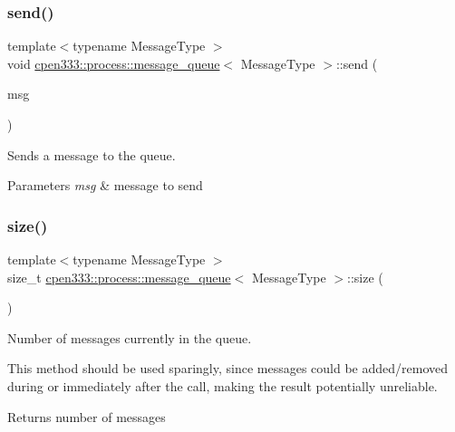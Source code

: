 \subsubsection{\texorpdfstring{send()}{send()}}
{\footnotesize\ttfamily template$<$typename Message\+Type $>$ \\
void \hyperlink{classcpen333_1_1process_1_1message__queue}{cpen333\+::process\+::message\+\_\+queue}$<$ Message\+Type $>$\+::send (\begin{DoxyParamCaption}\item[{const Message\+Type \&}]{msg }\end{DoxyParamCaption})\hspace{0.3cm}{\ttfamily [inline]}}



Sends a message to the queue. 


\begin{DoxyParams}{Parameters}
{\em msg} & message to send \\
\hline
\end{DoxyParams}
\mbox{\label{classcpen333_1_1process_1_1message__queue_aab604a8c153f7f918762abc7f2380396}} 
\subsubsection{\texorpdfstring{size()}{size()}}
{\footnotesize\ttfamily template$<$typename Message\+Type $>$ \\
size\+\_\+t \hyperlink{classcpen333_1_1process_1_1message__queue}{cpen333\+::process\+::message\+\_\+queue}$<$ Message\+Type $>$\+::size (\begin{DoxyParamCaption}{ }\end{DoxyParamCaption})\hspace{0.3cm}{\ttfamily [inline]}}



Number of messages currently in the queue. 

This method should be used sparingly, since messages could be added/removed during or immediately after the call, making the result potentially unreliable.

\begin{DoxyReturn}{Returns}
number of messages 
\end{DoxyReturn}
\mbox{\label{classcpen333_1_1process_1_1message__queue_a344d81de71e73ab318d2bf4a4a852a1b}} 
